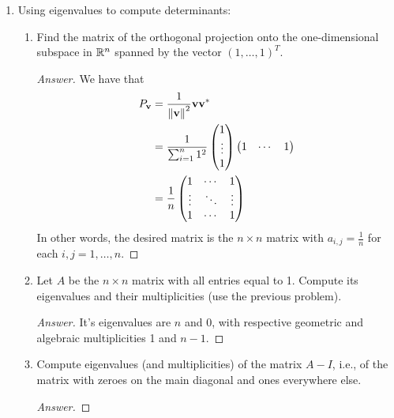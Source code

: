 \documentclass[../psets.tex]{subfiles}
\begin{document}
\begin{enumerate}[label={\textbf{3.\arabic*.}}]
\begin{proof}[Answer]
    \end{proof}
    \item Using eigenvalues to compute determinants:
    \begin{enumerate}
        \item Find the matrix of the orthogonal projection onto the one-dimensional subspace in $\mathbb{R}^n$ spanned by the vector $(1,\dots,1)^T$.
        \begin{proof}[Answer]
            We have that
            \begin{align*}
                P_{\mathbf{v}} &= \frac{1}{\norm{\mathbf{v}}^2}\mathbf{v}\mathbf{v}^*\\
                &= \frac{1}{\sum_{i=1}^n1^2}
                \begin{pmatrix}
                    1\\
                    \vdots\\
                    1\\
                \end{pmatrix}
                \begin{pmatrix}
                    1 & \cdots & 1\\
                \end{pmatrix}\\
                &= \frac{1}{n}
                \begin{pmatrix}
                    1 & \cdots & 1\\
                    \vdots & \ddots & \vdots\\
                    1 & \cdots & 1\\
                \end{pmatrix}
            \end{align*}
            In other words, the desired matrix is the $n\times n$ matrix with $a_{i,j}=\frac{1}{n}$ for each $i,j=1,\dots,n$.
        \end{proof}
        \item Let $A$ be the $n\times n$ matrix with all entries equal to 1. Compute its eigenvalues and their multiplicities (use the previous problem).
        \begin{proof}[Answer]
            It's eigenvalues are $n$ and 0, with respective geometric and algebraic multiplicities 1 and $n-1$.
        \end{proof}
        \item Compute eigenvalues (and multiplicities) of the matrix $A-I$, i.e., of the matrix with zeroes on the main diagonal and ones everywhere else.
        \begin{proof}[Answer]

\end{proof}
\end{enumerate}
\end{enumerate}
\end{document}
